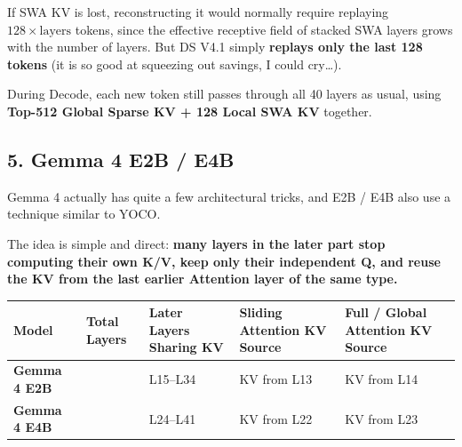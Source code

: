 \documentclass[
  11pt,
  a4paper,
]{article}
\newcounter{none} %
\begin{document}
If SWA KV is lost, reconstructing it would normally require replaying
\(128\times\text{layers}\) tokens, since the effective receptive field
of stacked SWA layers grows with the number of layers. But DS V4.1
simply \textbf{replays only the last 128 tokens} (it is so good at
squeezing out savings, I could cry\ldots).

During Decode, each new token still passes through all 40 layers as
usual, using \textbf{Top-512 Global Sparse KV + 128 Local SWA KV}
together.

\clearpage

\subsection{5. Gemma 4 E2B / E4B}\label{gemma-4-e2b-e4b}

Gemma 4 actually has quite a few architectural tricks, and E2B / E4B
also use a technique similar to YOCO.

The idea is simple and direct: \textbf{many layers in the later part
stop computing their own K/V, keep only their independent Q, and reuse
the KV from the last earlier Attention layer of the same type.}

{\def\LTcaptype{none} %
\begin{longtable}[]{@{}
  >{\raggedright\arraybackslash}p{}
  >{\raggedright\arraybackslash}p{}
  >{\raggedright\arraybackslash}p{}
  >{\raggedright\arraybackslash}p{}
  >{\raggedright\arraybackslash}p{}@{}}
\toprule\noalign{}
\begin{minipage}[b]{\linewidth}\raggedright
Model
\end{minipage} & \begin{minipage}[b]{\linewidth}\raggedright
Total Layers
\end{minipage} & \begin{minipage}[b]{\linewidth}\raggedright
Later Layers Sharing KV
\end{minipage} & \begin{minipage}[b]{\linewidth}\raggedright
Sliding Attention KV Source
\end{minipage} & \begin{minipage}[b]{\linewidth}\raggedright
Full / Global Attention KV Source
\end{minipage} \\
\midrule\noalign{}
\endhead
\bottomrule\noalign{}
\endlastfoot
\textbf{Gemma 4 E2B} & 35 & L15--L34 & KV from L13 & KV from L14 \\
\textbf{Gemma 4 E4B} & 42 & L24--L41 & KV from L22 & KV from L23 \\
\end{longtable}
}
\end{document}
